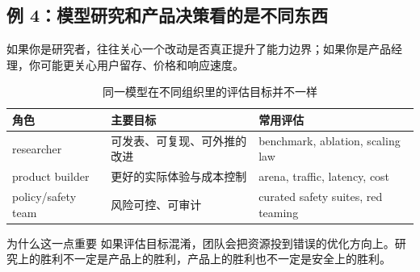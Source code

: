 \subsection{例 4：模型研究和产品决策看的是不同东西}

如果你是研究者，往往关心一个改动是否真正提升了能力边界；如果你是产品经理，你可能更关心用户留存、价格和响应速度。

\begin{table}[H]
\centering
\begin{tabular}{p{3.0cm}p{4.3cm}p{5.4cm}}
\toprule
\textbf{角色} & \textbf{主要目标} & \textbf{常用评估} \\
\midrule
researcher & 可发表、可复现、可外推的改进 & benchmark, ablation, scaling law \\
product builder & 更好的实际体验与成本控制 & arena, traffic, latency, cost \\
policy/safety team & 风险可控、可审计 & curated safety suites, red teaming \\
\bottomrule
\end{tabular}
\caption{同一模型在不同组织里的评估目标并不一样}
\end{table}

\begin{knowledgebox}{为什么这一点重要}
如果评估目标混淆，团队会把资源投到错误的优化方向上。研究上的胜利不一定是产品上的胜利，产品上的胜利也不一定是安全上的胜利。
\end{knowledgebox}

